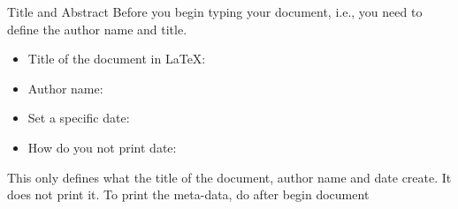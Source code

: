 \documentclass[10pt,times]{beamer}
\begin{document}
\begin{frame}{Title and Abstract}
Before you begin typing your document, i.e.,  you need 
to define the author name and title.
\begin{itemize}
\item Title of the document in \LaTeX: 
\item Author name: 
\item Set a specific date: 
\item How do you not print date: 
\end{itemize}
\centering
This only defines what the title of the document, author name and date create. 
It does not print it. To print the meta-data, do  after begin 
document
\end{frame}

\end{document}
